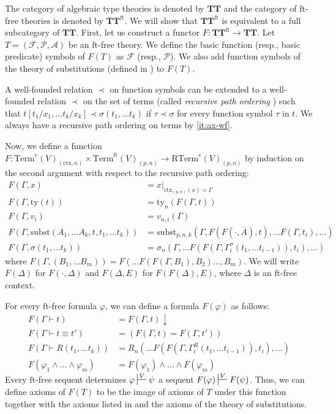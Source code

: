 \documentclass[reqno]{amsart}
\theoremstyle{definition}
\theoremstyle{remark}
\newcommand{\fs}[1]{\mathrm{#1}}
\newcommand{\Term}{\fs{Term}}
\newcommand{\RTerm}{\fs{RTerm}}
\newcommand{\subst}{\fs{subst}}
\newcommand{\ft}{\fs{ft}}
\newcommand{\ty}{\fs{ty}}
\newcommand{\ctx}{\fs{ctx}}
\newcommand{\cat}[1]{\mathbf{#1}}
\newcommand{\algtt}{\cat{TT}}
\numberwithin{figure}{section}
\begin{document}
The category of algebraic type theories is denoted by $\algtt$ and the category of $\ft$-free theories is denoted by $\algtt^\ft$.
We will show that $\algtt^\ft$ is equivalent to a full subcategory of $\algtt$.
First, let us construct a functor $F : \algtt^\ft \to \algtt$.
Let $T = (\mathcal{F},\mathcal{P},\mathcal{A})$ be an $\ft$-free theory.
We define the basic function (resp., basic predicate) symbols of $F(T)$ as $\mathcal{F}$ (resp., $\mathcal{P}$).
We also add function symbols of the theory of substitutions (defined in \cite[Section~3.1]{alg-tt}) to $F(T)$.

A well-founded relation $\prec$ on function symbols can be extended to a well-founded relation $\prec$ on the set of terms (called \emph{recursive path ordering} \cite{mrpo}) such that $t[t_1/x_1, \ldots t_k/x_k] \prec \sigma(t_1, \ldots t_k)$ if $\tau \prec \sigma$ for every function symbol $\tau$ in $t$.
We always have a recursive path ordering on terms by \eqref{it:ax-wf}.

Now, we define a function $F : \Term^e(V)_{(\ctx,n)} \times \Term^\ft(V)_{(p,n)} \to \RTerm^e(V)_{(p,n)}$ by induction on the second argument with respect to the recursive path ordering:
\begin{align*}
F(\Gamma, x) & = x|_{\ctx_{(p,n)}(x) = \Gamma} \\
F(\Gamma, \ty(t)) & = \ty_n(F(\Gamma, t)) \\
F(\Gamma, v_i) & = v_{n,i}(\Gamma) \\
F(\Gamma, \subst(A_1, \ldots A_k, t, t_1, \ldots t_k)) & = \subst_{p,n,k}(\Gamma, F(F(\cdot,\overline{A}), t), \ldots F(\Gamma, t_i), \ldots) \\
F(\Gamma, \sigma(t_1, \ldots t_k)) & = \sigma_n(\Gamma, \ldots F(F(\Gamma, \Gamma^\sigma_i(t_1, \ldots t_{i-1})), t_i), \ldots)
\end{align*}
where $F(\Gamma, (B_1, \ldots B_m)) = F(\ldots F(F(\Gamma, B_1), B_2) \ldots, B_m)$.
We will write $F(\Delta)$ for $F(\cdot,\Delta)$ and $F(\Delta,E)$ for $F(F(\Delta),E)$, where $\Delta$ is an $\ft$-free context.

For every $\ft$-free formula $\varphi$, we can define a formula $F(\varphi)$ as follows:
\begin{align*}
F(\Gamma \vdash t) & = F(\Gamma,t)\!\downarrow \\
F(\Gamma \vdash t \equiv t') & = (F(\Gamma,t) = F(\Gamma,t')) \\
F(\Gamma \vdash R(t_1, \ldots t_k)) & = R_n(\ldots F(F(\Gamma, \Gamma^R_i(t_1, \ldots t_{i-1})), t_i), \ldots) \\
F(\varphi_1 \land \ldots \land \varphi_m) & = F(\varphi_1) \land \ldots \land F(\varphi_m)
\end{align*}
Every $\ft$-free sequent determines $\varphi \sststile{}{V} \psi$ a sequent $F(\varphi) \sststile{}{V} F(\psi)$.
Thus, we can define axioms of $F(T)$ to be the image of axioms of $T$ under this function together with the axioms listed in  and the axioms of the theory of substitutions.
\end{document}

